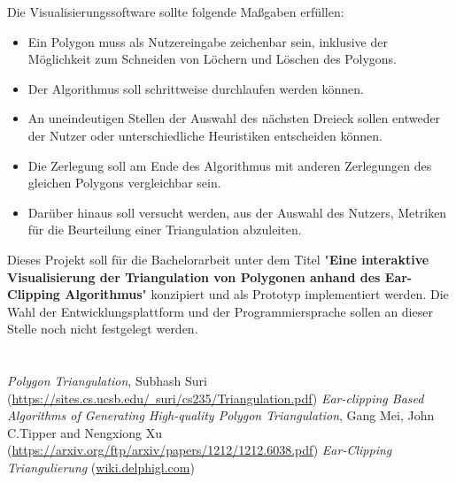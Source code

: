 \documentclass[11pt]{article}
\begin{document}
Die Visualisierungssoftware sollte folgende Maßgaben erfüllen:

\begin{itemize}
 \item Ein Polygon muss als Nutzereingabe zeichenbar sein, inklusive der Möglichkeit zum Schneiden von Löchern und Löschen des Polygons.
 \item Der Algorithmus soll schrittweise durchlaufen werden können.
 \item An uneindeutigen Stellen der Auswahl des nächsten Dreieck sollen entweder der Nutzer oder unterschiedliche Heuristiken entscheiden können.
 \item Die Zerlegung soll am Ende des Algorithmus mit anderen Zerlegungen des gleichen Polygons vergleichbar sein.
 \item Darüber hinaus soll versucht werden, aus der Auswahl des Nutzers, Metriken für die Beurteilung einer Triangulation abzuleiten.
\end{itemize}
Dieses Projekt soll für die Bachelorarbeit unter dem Titel "\textbf{Eine interaktive Visualisierung der Triangulation von Polygonen anhand des Ear-Clipping Algorithmus}" konzipiert und als Prototyp
implementiert werden. Die Wahl der Entwicklungsplattform und der Programmiersprache sollen an dieser Stelle noch nicht festgelegt werden.
\pagebreak
\section*{}
\begin{thebibliography}{11}
  \emph{Polygon Triangulation}, Subhash Suri (\href{https://sites.cs.ucsb.edu/~suri/cs235/Triangulation.pdf}{https://sites.cs.ucsb.edu/~suri/cs235/Triangulation.pdf}) 
  \emph{Ear-clipping Based Algorithms of Generating High-quality Polygon Triangulation}, Gang Mei, John C.Tipper and Nengxiong Xu (\href{https://arxiv.org/ftp/arxiv/papers/1212/1212.6038.pdf}{https://arxiv.org/ftp/arxiv/papers/1212/1212.6038.pdf})
  \emph{Ear-Clipping Triangulierung} (\href{https://wiki.delphigl.com/index.php/Ear_Clipping_Triangulierung}{wiki.delphigl.com})
  
  \end{thebibliography}
\end{document}

